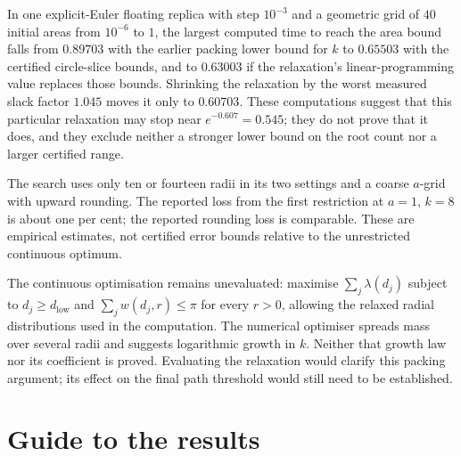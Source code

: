 \documentclass[11pt]{article}
\begin{document}
In one explicit-Euler floating replica with step $10^{-3}$ and a geometric grid
of $40$ initial areas from $10^{-6}$ to $1$, the largest computed time to reach the area bound
falls from $0.89703$ with the earlier packing lower bound for $k$ to
$0.65503$ with the certified circle-slice bounds, and to $0.63003$ if
the relaxation's linear-programming value replaces those bounds.  Shrinking the relaxation by the worst
measured slack factor $1.045$ moves it only to $0.60703$.  These computations
suggest that this particular relaxation may stop near
$e^{-0.607}=0.545$; they do not prove that it does, and they exclude neither a stronger lower bound on the root count nor a larger certified
range.

The search uses only ten or fourteen radii in its two settings and a
coarse $a$-grid with upward rounding. The reported loss from the first
restriction at $a=1$, $k=8$ is about one per cent; the reported rounding
loss is comparable. These are empirical estimates, not certified error
bounds relative to the unrestricted continuous optimum.

The continuous optimisation remains unevaluated: maximise
$\sum_j\lambda(d_j)$ subject to $d_j\ge d_{\mathrm{low}}$ and
$\sum_jw(d_j,r)\le\pi$ for every $r>0$, allowing the relaxed radial
distributions used in the computation. The numerical optimiser spreads
mass over several radii and suggests logarithmic growth in $k$.
Neither that growth law nor its coefficient is proved. Evaluating the
relaxation would clarify this packing argument; its effect on the final
path threshold would still need to be established.

\section{Guide to the results}\label{sec:erdos-1041-complete-family-map}
\end{document}
